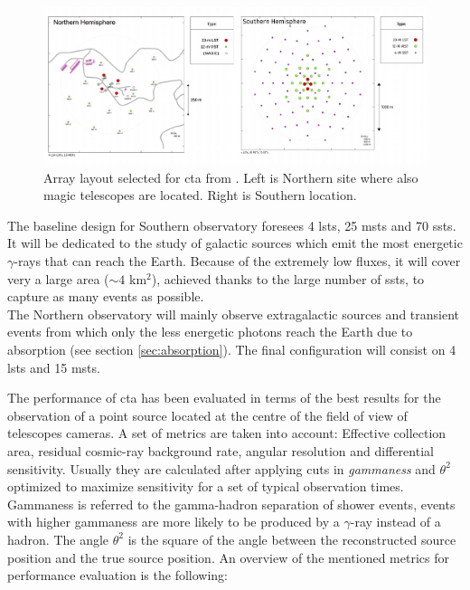 \documentclass[main.tex]{subfiles}
\begin{document}
\begin{figure}
\centering
 \includegraphics[width=1\textwidth]{Pictures/Array-Layouts.pdf}
  \caption{Array layout selected for \gls{cta} from \cite{CTAPerformance}. Left is Northern site where also \gls{magic} telescopes are located. Right is Southern location.}
    \label{fig:arraylayout}
\end{figure}

The baseline design for Southern observatory foresees 4 \glspl{lst}, 25 \glspl{mst} and 70 \glspl{sst}. It will be dedicated to the study of galactic sources which emit the most energetic $\gamma$-rays that can reach the Earth. Because of the extremely low fluxes, it will cover very a large area ($\sim4$ km$^2$), achieved thanks to the large number of \glspl{sst}, to capture as many events as possible.\\
The Northern observatory will mainly observe extragalactic sources and transient events from which only the less energetic photons reach the Earth due to absorption (see section \ref{sec:absorption}). The final configuration will consist on 4 \glspl{lst} and 15 \glspl{mst}.

The performance of \gls{cta} has been evaluated in terms of the best results for the observation of a point source located at the centre of the field of view of telescopes cameras. A set of metrics are taken into account: Effective collection area, residual cosmic-ray background rate, angular resolution and differential sensitivity. Usually they are calculated after applying cuts in \textit{gammaness} and $\theta^2$ optimized to maximize sensitivity for a set of typical observation times. Gammaness is referred to the gamma-hadron separation of shower events, events with higher gammaness are more likely to be produced by a $\gamma$-ray instead of a hadron. The angle $\theta^2$ is the square of the angle between the reconstructed source position and the true source position.
An overview of the mentioned metrics for performance evaluation is the following:\\
\end{document}
